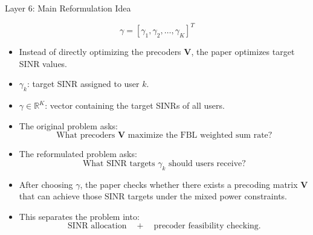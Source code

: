 \documentclass{beamer}
\begin{document}
\begin{frame}{Layer 6: Main Reformulation Idea}
\scriptsize

\[
    \gamma
    =
    [\gamma_1,\gamma_2,\ldots,\gamma_K]^T
\]

\begin{itemize}
    \item Instead of directly optimizing the precoders \(\mathbf{V}\), the paper optimizes target SINR values.

    \item \(\gamma_k\): target SINR assigned to user \(k\).

    \item \(\gamma\in\mathbb{R}^{K}\): vector containing the target SINRs of all users.

    \item The original problem asks:
    \[
        \text{What precoders } \mathbf{V} \text{ maximize the FBL weighted sum rate?}
    \]

    \item The reformulated problem asks:
    \[
        \text{What SINR targets } \gamma_k \text{ should users receive?}
    \]

    \item After choosing \(\gamma\), the paper checks whether there exists a precoding matrix \(\mathbf{V}\) that can achieve those SINR targets under the mixed power constraints.

    \item This separates the problem into:
    \[
        \text{SINR allocation}
        \quad+\quad
        \text{precoder feasibility checking}.
    \]
\end{itemize}

\end{frame}
\end{document}
